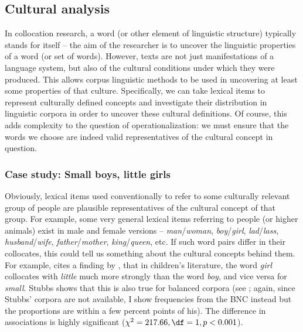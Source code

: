 \subsection{Cultural analysis}
\label{sec:culturalanalysis}

In collocation  research, a word (or other element of linguistic structure) typically stands for itself -- the aim of the researcher is to uncover the linguistic properties of a word (or set of words). However, texts are not just manifestations of a language system, but also of the cultural  conditions under which they were produced. This allows corpus linguistic methods to be used in uncovering at least some properties of that culture. Specifically, we can take lexical items to represent culturally  defined concepts and investigate their distribution  in linguistic corpora in order to uncover these cultural definitions. Of course, this adds complexity to the question of operationalization:  we must ensure that the words we choose are indeed valid  representatives  of the cultural  concept in question.

\subsubsection{Case study: Small boys, little girls}
\label{sec:smallboyslittlegirls}

Obviously, lexical items used conventionally  to refer to some culturally  relevant group of people are plausible representatives  of the cultural concept of that group. For example, some very general lexical items referring to people (or higher animals)  exist in male and female versions -- \textit{man}\slash \textit{woman}, \textit{boy}\slash \textit{girl}, \textit{lad}\slash \textit{lass}, \textit{husband}\slash \textit{wife}, \textit{father}\slash \textit{mother}, \textit{king}\slash \textit{queen}, etc. If such word pairs differ in their collocates,  this could tell us something about the cultural  concepts behind them. For example, \citet{stubbs_collocations_1995-1} cites a finding by \citet{baker_childrens_1989}, that in children's literature,  the word \textit{girl} collocates  with \textit{little} much more strongly than the word \textit{boy}, and vice versa for \textit{small}.  Stubbs shows that this is also true for balanced corpora (see ; again, since Stubbs' corpora are not available, I show frequencies  from the BNC  instead but the proportions are within a few percent points of his). The difference in associations  is highly significant ($\chi^2 = 217.66, \df = 1, p < 0.001$).

